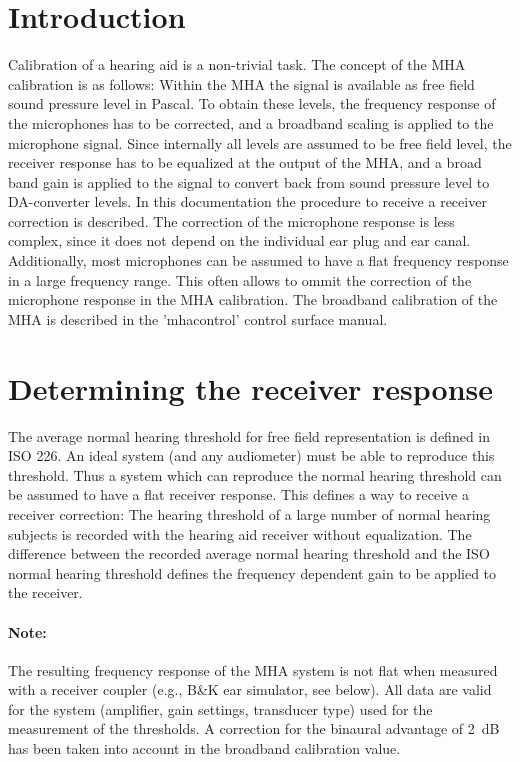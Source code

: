 \documentclass[11pt,a4paper,twoside]{article}
\begin{document}
\newpage
\MHAcopyright{}
\newpage
\tableofcontents
\newpage
\renewcommand{\leftmark}{\rightmark}

\section{Introduction}

Calibration of a hearing aid is a non-trivial task.
%
The concept of the MHA calibration is as follows:
%
Within the MHA the signal is available as free field sound pressure
level in Pascal.
%
To obtain these levels, the frequency response of the microphones has
to be corrected, and a broadband scaling is applied to the microphone
signal.
%
Since internally all levels are assumed to be free field level, the
receiver response has to be equalized at the output of the MHA, and a
broad band gain is applied to the signal to convert back from sound
pressure level to DA-converter levels.
%
In this documentation the procedure to receive a receiver correction
is described.
%
The correction of the microphone response is less complex, since it
does not depend on the individual ear plug and ear canal.
%
Additionally, most microphones can be assumed to have a flat frequency
response in a large frequency range.
%
This often allows to ommit the correction of the microphone response
in the MHA calibration.
%
The broadband calibration of the MHA is described in the 'mhacontrol'
control surface manual.

\section{Determining the receiver response}

The average normal hearing threshold for free field representation is
defined in ISO 226.
%
An ideal system (and any audiometer) must be able to reproduce this
threshold.
%
Thus a system which can reproduce the normal hearing threshold can be
assumed to have a flat receiver response.
%
This defines a way to receive a receiver correction:
%
The hearing threshold of a large number of normal hearing subjects is
recorded with the hearing aid receiver without equalization.
%
The difference between the recorded average normal hearing threshold
and the ISO normal hearing threshold defines the frequency dependent
gain to be applied to the receiver.

\paragraph{Note:} 
%
The resulting frequency response of the MHA system is not flat when
measured with a receiver coupler (e.g., B\&K ear simulator, see
below).
%
All data are valid for the system (amplifier, gain settings,
transducer type) used for the measurement of the thresholds.
%
A correction for the binaural advantage of 2~dB has been taken into
account in the broadband calibration value.
\end{document}
